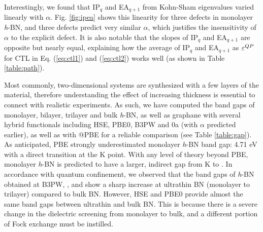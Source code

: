 Interestingly, we found that IP$_q$ and EA$_{q+1}$ from Kohn-Sham eigenvalues varied linearly with $\alpha$.
Fig. \ref{fig:ipea} shows this linearity for three defects in monolayer \textit{h}-BN, and three defects predict very similar $\alpha$, which justifies the insensitivity of $\alpha$ to the explicit defect. %
It is also notable that the slopes of  IP$_q$ and EA$_{q+1}$ are opposite but nearly equal, explaining how the average of IP$_q$ and EA$_{q+1}$ as $\varepsilon^{QP}$ for CTL in Eq. (\ref{eq:ctl1}) and (\ref{eq:ctl2}) works well (as shown in Table \ref{table:path}).





Most commonly, two-dimensional systems are synthesized with a few layers of the material, therefore understanding the effect of increasing thickness is essential to connect with realistic experiments. As such, we have computed the band gaps of monolayer, bilayer, trilayer and bulk \textit{h}-BN, as well as graphane with several hybrid functionals including HSE, PBE0, B3PW and \p0a (with $\alpha$ predicted earlier), as well as with \gwns @PBE for a reliable comparison (see Table \ref{table:gap}). As anticipated, PBE strongly underestimated monolayer \textit{h}-BN band gap: 4.71 eV with a direct transition at the K point. With any level of theory beyond PBE, monolayer \textit{h}-BN is predicted to have a larger, indirect gap from K to \gns. In accordance with quantum confinement, we observed that the band gaps of \textit{h}-BN obtained at B3PW,  \pans , and \gw show a sharp increase at ultrathin BN (monolayer to trilayer) compared to bulk BN. However, HSE and PBE0 provide almost the same band gaps between ultrathin and bulk BN. This is because there is a severe change in the dielectric screening from monolayer to bulk, and a different portion of Fock exchange must be instilled.

